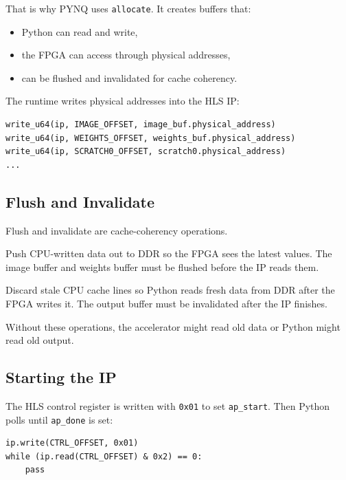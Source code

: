 \documentclass[11pt]{article}
\newcommand{\code}[1]{\texttt{#1}}
\begin{document}
That is why PYNQ uses \code{allocate}.
It creates buffers that:

\begin{itemize}[leftmargin=1.4em]
  \item Python can read and write,
  \item the FPGA can access through physical addresses,
  \item can be flushed and invalidated for cache coherency.
\end{itemize}

The runtime writes physical addresses into the HLS IP:

\begin{lstlisting}
write_u64(ip, IMAGE_OFFSET, image_buf.physical_address)
write_u64(ip, WEIGHTS_OFFSET, weights_buf.physical_address)
write_u64(ip, SCRATCH0_OFFSET, scratch0.physical_address)
...
\end{lstlisting}

\subsection{Flush and Invalidate}

Flush and invalidate are cache-coherency operations.

\begin{description}[leftmargin=2.8em,style=nextline]
  \item[Flush]
  Push CPU-written data out to DDR so the FPGA sees the latest values.
  The image buffer and weights buffer must be flushed before the IP reads them.

  \item[Invalidate]
  Discard stale CPU cache lines so Python reads fresh data from DDR after the FPGA writes it.
  The output buffer must be invalidated after the IP finishes.
\end{description}

Without these operations, the accelerator might read old data or Python might read old output.

\subsection{Starting the IP}

The HLS control register is written with \code{0x01} to set \code{ap\_start}.
Then Python polls until \code{ap\_done} is set:

\begin{lstlisting}
ip.write(CTRL_OFFSET, 0x01)
while (ip.read(CTRL_OFFSET) & 0x2) == 0:
    pass
\end{lstlisting}
\end{document}
